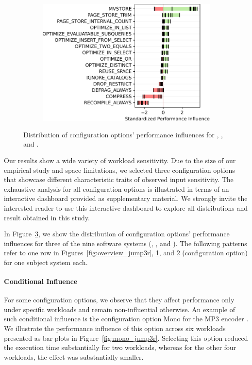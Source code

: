 {{{\begin{figure}
\begin{subfigure}{0.3\linewidth}
		\caption{\zdrei}
		\label{fig:overview_z3}
	\end{subfigure}
	\begin{subfigure}{0.4\linewidth}
		\centering
		\includegraphics[width=\linewidth]{images/h2.pdf}
		\caption{\htwo}
		\label{fig:overview_h2}
	\end{subfigure}
	
	\caption{Distribution of configuration options' performance influences for \jumper, \zdrei, and \htwo.}
	\label{fig:three_systems}
\end{figure}
	
Our results show a wide variety of workload sensitivity. Due to the size of our empirical study and space limitations, we selected three configuration options that showcase different characteristic traits of observed input sensitivity. The exhaustive analysis for all configuration options is illustrated in terms of an interactive dashboard provided as supplementary material. We strongly invite the interested reader to use this interactive dashboard to explore all distributions and result obtained in this study.

{In Figure~\ref{fig:three_systems}, we show the distribution of configuration options' performance influences for three of the nine software systems (\jumper, \zdrei, and \htwo). The following patterns refer to one row in Figures~\ref{fig:overview_jump3r}, \ref{fig:overview_z3}, and \ref{fig:overview_h2} (configuration option) for one subject system each.}

\paragraph{Conditional Influence}\label{sec:conditional_influence} For some configuration options, we observe that they affect performance only under specific workloads and remain non-influential otherwise. An example of such conditional influence is the configuration option \textsf{Mono} for the MP3 encoder \jumper. We illustrate the performance influence of this option across six workloads presented as bar plots in Figure~\ref{fig:mono_jump3r}. Selecting this option reduced the execution time substantially for two workloads, whereas for the other four workloads, the effect was substantially smaller.

}}}
